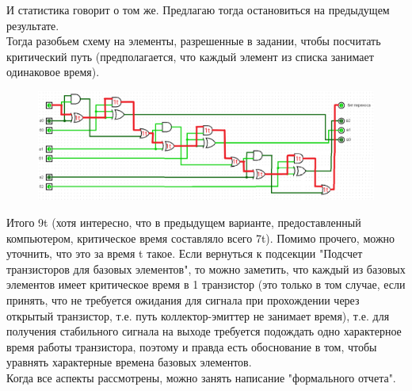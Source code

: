 И статистика говорит о том же. Предлагаю тогда остановиться на предыдущем результате. \\
Тогда разобьем схему на элементы, разрешенные в задании, чтобы посчитать критический путь (предполагается, что каждый элемент из списка занимает одинаковое время). 
\begin{figure}[H]
    \centering
    \includegraphics[width=1\linewidth]{crit way.png}
\end{figure}
Итого 9t (хотя интересно, что в предыдущем варианте, предоставленный компьютером, критическое время составляло всего 7t).
Помимо прочего, можно уточнить, что это за время t такое. Если вернуться к подсекции "Подсчет транзисторов для базовых элементов", то можно заметить, что каждый из базовых элементов имеет критическое время в 1 транзистор (это только в том случае, если принять, что не требуется ожидания для сигнала при прохождении через открытый транзистор, т.е. путь коллектор-эмиттер не занимает время), т.е. для получения стабильного сигнала на выходе требуется подождать одно характерное время работы транзистора, поэтому и правда есть обоснование в том, чтобы уравнять характерные времена базовых элементов.\\
Когда все аспекты рассмотрены, можно занять написание "формального отчета".
